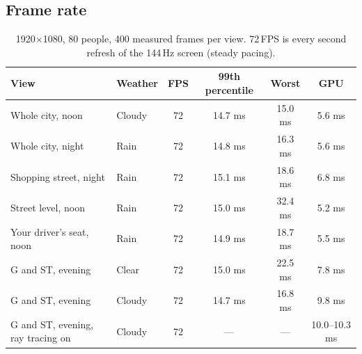 \documentclass[11pt,a4paper]{article}
\begin{document}
\subsection{Frame rate}
\begin{table}[H]
\centering\small
\begin{tabular}{@{}llcccc@{}}
\toprule
View & Weather & FPS & 99th percentile & Worst & GPU \\ \midrule
Whole city, noon & Cloudy & 72 & 14.7 ms & 15.0 ms & 5.6 ms\\
Whole city, night & Rain & 72 & 14.8 ms & 16.3 ms & 5.6 ms\\
Shopping street, night & Rain & 72 & 15.1 ms & 18.6 ms & 6.8 ms\\
Street level, noon & Rain & 72 & 15.0 ms & 32.4 ms & 5.2 ms\\
Your driver's seat, noon & Rain & 72 & 14.9 ms & 18.7 ms & 5.5 ms\\
G and ST, evening & Clear & 72 & 15.0 ms & 22.5 ms & 7.8 ms\\
G and ST, evening & Cloudy & 72 & 14.7 ms & 16.8 ms & 9.8 ms\\
G and ST, evening, ray tracing on & Cloudy & 72 & --- & --- & 10.0--10.3 ms\\
\bottomrule
\end{tabular}
\caption{1920$\times$1080, 80 people, 400 measured frames per view. 72\,FPS is every second refresh of the 144\,Hz screen (steady pacing).}
\end{table}
\end{document}
